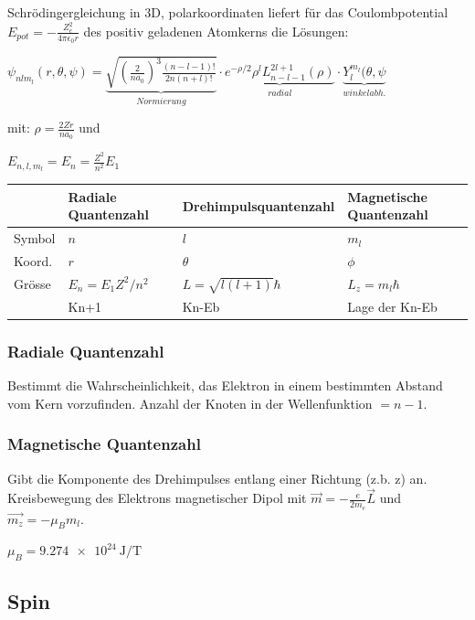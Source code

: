 \documentclass[10pt,a4paper]{scrartcl}
\begin{document}
\begin{multicols*}{3}
	Schrödingergleichung in 3D, polarkoordinaten liefert für das Coulombpotential $E_{pot}=-\frac{Z_e^2}{4\pi\epsilon_0r}$ des positiv geladenen Atomkerns die Lösungen:
	
	\footnotesize	
	$\psi_{nlm_l}(r,\theta,\psi)=\underbrace{\sqrt{(\frac{2}{na_0})^3\frac{(n-l-1)!}{2n(n+l)!}}}_{Normierung}\cdot\underbrace{e^{-\rho/2}\rho^lL_{n-l-1}^{2l+1}(\rho)}_{radial}\cdot\underbrace{Y_l^{m_l}(\theta,\psi}_{winkelabh.}$
	\normalsize
	
	\finn	
	
	mit: $\rho=\frac{2Zr}{na_0}$ und 
	
	\finn
	
	$E_{n,l,m_l}=E_n=\frac{Z^2}{n^2}E_1$
	
	\finn	
		
	\footnotesize
	\begin{tabulary}{\linewidth}{lLLL}
	&Radiale Quantenzahl&Drehimpulsquantenzahl&Magnetische Quantenzahl\\
	\hline
	Symbol&$n$&$l$&$m_l$\\
	\hline
	Koord.&$r$&$\theta$&$\phi$\\
	\hline
	Grösse&$E_n=E_1Z^2/n^2$&$L=\sqrt{l(l+1)}\hbar$&$L_z=m_l\hbar$\\
	\hline
	&Kn+1&Kn-Eb&Lage der Kn-Eb
	\end{tabulary}
	\normalsize
	
	\subsubsection{Radiale Quantenzahl}
	
	Bestimmt die Wahrscheinlichkeit, das Elektron in einem bestimmten Abstand vom Kern vorzufinden. Anzahl der Knoten in der Wellenfunktion $= n-1$.
	
	\subsubsection{Magnetische Quantenzahl}

	Gibt die Komponente des Drehimpulses entlang einer Richtung (z.b. z) an. Kreisbewegung des Elektrons \dahe magnetischer Dipol mit $\vec{m}=-\frac{e}{2m_e}\vec{L}$ und $\vec{m_z}=-\mu_Bm_l$.
	
	$\mu_B=\SI{9.274e24}{\joule\per\tesla}$
	
	\subsection{Spin}
	

\end{multicols*}
\end{document}
